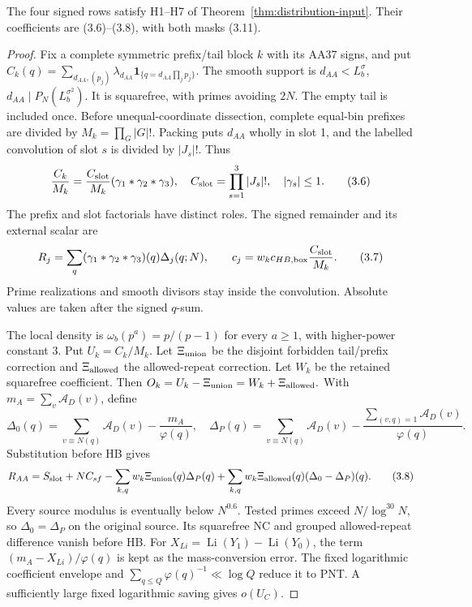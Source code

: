 \begin{lemma}
The four signed rows satisfy H1--H7 of Theorem~\ref{thm:distribution-input}.
Their coefficients are (3.6)--(3.8), with both masks (3.11).
\end{lemma}
\begin{proof}
Fix a complete symmetric prefix/tail block $k$ with its AA37 signs, and put
$C_k(q)=\sum_{d_{AA},(p_j)}\lambda_{d_{AA}}
                   \mathbf1_{\{q=d_{AA}\prod_jp_j\}}.$
The smooth support is
$d_{AA}<L_b^\sigma$, $d_{AA}\mid P_N(L_b^{\sigma^2})$.
It is squarefree, with primes avoiding $2N$.
The empty tail is included once.
Before unequal-coordinate dissection, complete equal-bin prefixes are divided by $M_k=\prod_G|G|!$.
Packing puts $d_{AA}$ wholly in slot 1, and the labelled convolution of slot $s$ is divided by $|J_s|!$. Thus
\[
 \frac{C_k}{M_k}=\frac{C_{\rm slot}}{M_k}
                         (\gamma_1*\gamma_2*\gamma_3),\quad
 C_{\rm slot}=\prod_{s=1}^3|J_s|!,\quad |\gamma_s|\le1.
 \tag{3.6}
\]
The prefix and slot factorials have distinct roles.
The signed remainder and its external scalar are
\[
 R_j=\sum_q(\gamma_1*\gamma_2*\gamma_3)(q)\Delta_j(q;N),
 \qquad c_j=w_kc_{{HB},{\rm box}}\frac{C_{\rm slot}}{M_k}.
 \tag{3.7}
\]
Prime realizations and smooth divisors stay inside the convolution.
Absolute values are taken after the signed $q$-sum.

The local density is $\omega_b(p^a)=p/(p-1)$ for every $a\ge1$, with higher-power constant 3.
Put $U_k=C_k/M_k$.
Let $\Xi_{\rm union}$ be the disjoint forbidden tail/prefix correction and
$\Xi_{\rm allowed}$ the allowed-repeat correction.
Let $W_k$ be the retained squarefree coefficient.
Then $O_k=U_k-\Xi_{\rm union}=W_k+\Xi_{\rm allowed}.$
With $m_A=\sum_v\mathcal A_D(v)$, define
\[
 \Delta_0(q)=\sum_{v\equiv N(q)}\mathcal A_D(v)-\frac{m_A}{\varphi(q)},
 \quad
 \Delta_P(q)=\sum_{v\equiv N(q)}\mathcal A_D(v)
             -\frac{\sum_{(v,q)=1}\mathcal A_D(v)}{\varphi(q)}.
\]
Substitution before HB gives
\[
 R_{AA}=S_{\rm slot}+NC_{sf}
 -\sum_{k,q}w_k\Xi_{\rm union}(q)\Delta_P(q)
 +\sum_{k,q}w_k\Xi_{\rm allowed}(q)(\Delta_0-\Delta_P)(q).
 \tag{3.8}
\]
Every source modulus is eventually below $N^{0.6}$.
Tested primes exceed $N/\log^{30}N$,
so $\Delta_0=\Delta_P$ on the original source.
Its squarefree NC and grouped allowed-repeat difference vanish before HB.
For $X_{Li}=\operatorname{Li}(Y_1)-\operatorname{Li}(Y_0)$, the term
$(m_A-X_{Li})/\varphi(q)$ is kept as the mass-conversion error.
The fixed logarithmic coefficient envelope and
$\sum_{q\le Q}\varphi(q)^{-1}\ll\log Q$ reduce it to PNT.
A sufficiently large fixed logarithmic saving gives $o(U_C)$.


\end{proof}
